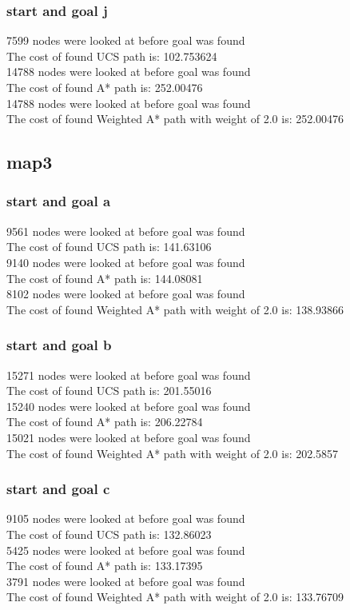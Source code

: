 \documentclass[11pt]{article} %
\begin{document}
\subsubsection{start and goal j}
7599 nodes were looked at before goal was found\\
The cost of found UCS path is: 102.753624\\
14788 nodes were looked at before goal was found\\
The cost of found A* path is: 252.00476\\
14788 nodes were looked at before goal was found\\
The cost of found Weighted A* path with weight of 2.0 is: 252.00476\\

\subsection{map3}
\subsubsection{start and goal a}
9561 nodes were looked at before goal was found\\
The cost of found UCS path is: 141.63106\\
9140 nodes were looked at before goal was found\\
The cost of found A* path is: 144.08081\\
8102 nodes were looked at before goal was found\\
The cost of found Weighted A* path with weight of 2.0 is: 138.93866\\
\subsubsection{start and goal b}
15271 nodes were looked at before goal was found\\
The cost of found UCS path is: 201.55016\\
15240 nodes were looked at before goal was found\\
The cost of found A* path is: 206.22784\\
15021 nodes were looked at before goal was found\\
The cost of found Weighted A* path with weight of 2.0 is: 202.5857\\
\subsubsection{start and goal c}
9105 nodes were looked at before goal was found\\
The cost of found UCS path is: 132.86023\\
5425 nodes were looked at before goal was found\\
The cost of found A* path is: 133.17395\\
3791 nodes were looked at before goal was found\\
The cost of found Weighted A* path with weight of 2.0 is: 133.76709\\
\end{document}
